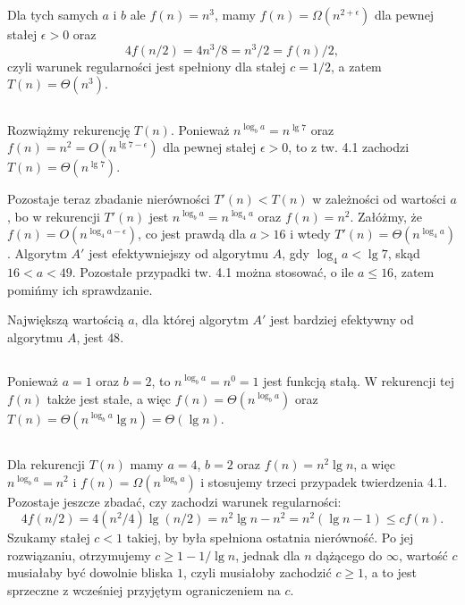 \subsubsection{}
Dla tych samych $a$ i $b$ ale $f(n)=n^3$, mamy $f(n)=\Omega(n^{2+\epsilon})$ dla pewnej stałej $\epsilon>0$ oraz
\[
	4f(n/2)=4n^3/8=n^3/2=f(n)/2,
\]
czyli warunek regularności jest spełniony dla stałej $c=1/2$, a zatem $T(n)=\Theta(n^3)$.

\subsection{} %
Rozwiążmy rekurencję $T(n)$. Ponieważ $n^{\log_ba}=n^{\lg 7}$ oraz $f(n)=n^2=O(n^{\lg 7-\epsilon})$ dla pewnej stałej $\epsilon>0$, to z tw. 4.1 zachodzi $T(n)=\Theta(n^{\lg 7})$.

Pozostaje teraz zbadanie nierówności $T'(n)<T(n)$ w zależności od wartości $a$, bo w rekurencji $T'(n)$ jest $n^{\log_ba}=n^{\log_4a}$ oraz $f(n)=n^2$. Załóżmy, że $f(n)=O(n^{\log_4a-\epsilon})$, co jest prawdą dla $a>16$ i wtedy $T'(n)=\Theta(n^{\log_4a})$. Algorytm $A'$ jest efektywniejszy od algorytmu $A$, gdy $\log_4a<\lg 7$, skąd $16<a<49$. Pozostałe przypadki tw. 4.1 można stosować, o ile $a\le 16$, zatem pomińmy ich sprawdzanie.

Największą wartością $a$, dla której algorytm $A'$ jest bardziej efektywny od algorytmu $A$, jest $48$.

\subsection{} %
Ponieważ $a=1$ oraz $b=2$, to $n^{\log_ba}=n^0=1$ jest funkcją stałą. W rekurencji tej $f(n)$ także jest stałe, a więc $f(n)=\Theta(n^{\log_ba})$ oraz $T(n)=\Theta(n^{\log_ba}\lg n)=\Theta(\lg n)$.

\subsection{} %
Dla rekurencji $T(n)$ mamy $a=4$, $b=2$ oraz $f(n)=n^2\lg n$, a więc $n^{\log_ba}=n^2$ i $f(n)=\Omega(n^{\log_ba})$ i stosujemy trzeci przypadek twierdzenia 4.1. Pozostaje jeszcze zbadać, czy zachodzi warunek regularności:
\[
	4f(n/2) = 4(n^2/4)\lg(n/2) = n^2\lg n-n^2 = n^2(\lg n-1)\le cf(n).
\]
Szukamy stałej $c<1$ takiej, by była spełniona ostatnia nierówność. Po jej rozwiązaniu, otrzymujemy $c\ge 1-1/\lg n$, jednak dla $n$ dążącego do $\infty$, wartość $c$ musiałaby być dowolnie bliska $1$, czyli musiałoby zachodzić $c\ge 1$, a to jest sprzeczne z wcześniej przyjętym ograniczeniem na $c$.

